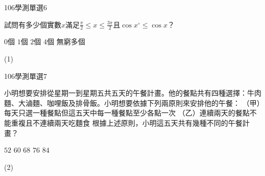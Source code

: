    \begin{QUESTION}
        \begin{ExamInfo}{106}{學測}{單選}{6}
        \end{ExamInfo}
        \begin{ExamAnsRateInfo}{22}{43}{16}{7}
        \end{ExamAnsRateInfo}
        \begin{QBODY}
            試問有多少個實數$x$滿足$\frac{\pi }{2}\le x\le \frac{3\pi }{2}$且$\cos x{}^\circ \le \cos x$？
			\begin{QOPS}
				\QOP $0$個     
				\QOP $1$個     
				\QOP $2$個     
				\QOP $4$個     
				\QOP 無窮多個
			\end{QOPS}
        \end{QBODY}
        \begin{QFROMS}
        \end{QFROMS}
        \begin{QTAGS}\end{QTAGS}
        \begin{QANS}
            (1)
        \end{QANS}
        \begin{QSOLLIST}
        \end{QSOLLIST}
        \begin{QEMPTYSPACE}
        \end{QEMPTYSPACE}
    \end{QUESTION}
    \begin{QUESTION}
        \begin{ExamInfo}{106}{學測}{單選}{7}
        \end{ExamInfo}
        \begin{ExamAnsRateInfo}{29}{40}{27}{20}
        \end{ExamAnsRateInfo}
        \begin{QBODY}
            小明想要安排從星期一到星期五共五天的午餐計畫。他的餐點共有四種選擇：牛肉麵、大滷麵、咖哩飯及排骨飯。小明想要依據下列兩原則來安排他的午餐：
			（甲）每天只選一種餐點但這五天中每一種餐點至少各點一次
			（乙）連續兩天的餐點不能重複且不連續兩天吃麵食
			根據上述原則，小明這五天共有幾種不同的午餐計畫？
			\begin{QOPS}
				\QOP $52$      
				\QOP $60$      
				\QOP $68$      
				\QOP $76$      
				\QOP $84$
			\end{QOPS}
        \end{QBODY}
        \begin{QFROMS}
        \end{QFROMS}
        \begin{QTAGS}\end{QTAGS}
        \begin{QANS}
            (2)
        \end{QANS}
        \begin{QSOLLIST}
        \end{QSOLLIST}
        \begin{QEMPTYSPACE}
        \end{QEMPTYSPACE}
    \end{QUESTION}
